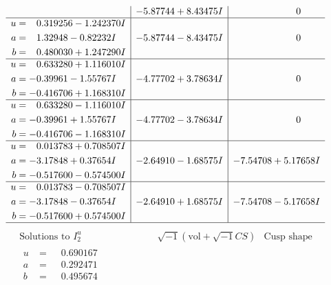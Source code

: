 \documentclass[1p]{elsarticle_modified}
\theoremstyle{definition}
\newcommand{\I}{\sqrt{-1}}
\begin{document}
$$\begin{array}{c|c|c}
 & -5.87744 + 8.43475 I & \phantom{-0.000000 } 0 \\ \hline\begin{aligned}
u &= \phantom{-}0.319256 - 1.242370 I \\
a &= \phantom{-}1.32948 - 0.82232 I \\
b &= \phantom{-}0.480030 + 1.247290 I\end{aligned}
 & -5.87744 - 8.43475 I & \phantom{-0.000000 } 0 \\ \hline\begin{aligned}
u &= \phantom{-}0.633280 + 1.116010 I \\
a &= -0.39961 - 1.55767 I \\
b &= -0.416706 + 1.168310 I\end{aligned}
 & -4.77702 + 3.78634 I & \phantom{-0.000000 } 0 \\ \hline\begin{aligned}
u &= \phantom{-}0.633280 - 1.116010 I \\
a &= -0.39961 + 1.55767 I \\
b &= -0.416706 - 1.168310 I\end{aligned}
 & -4.77702 - 3.78634 I & \phantom{-0.000000 } 0 \\ \hline\begin{aligned}
u &= \phantom{-}0.013783 + 0.708507 I \\
a &= -3.17848 + 0.37654 I \\
b &= -0.517600 - 0.574500 I\end{aligned}
 & -2.64910 - 1.68575 I & -7.54708 + 5.17658 I \\ \hline\begin{aligned}
u &= \phantom{-}0.013783 - 0.708507 I \\
a &= -3.17848 - 0.37654 I \\
b &= -0.517600 + 0.574500 I\end{aligned}
 & -2.64910 + 1.68575 I & -7.54708 - 5.17658 I\\
 \hline 
 \end{array}$$\newpage$$\begin{array}{c|c|c}  
\text{Solutions to }I^u_{2}& \I (\text{vol} + \sqrt{-1}CS) & \text{Cusp shape}\\
 \hline 
\begin{aligned}
u &= \phantom{-}0.690167\phantom{ +0.000000I} \\
a &= \phantom{-}0.292471\phantom{ +0.000000I} \\
b &= \phantom{-}0.495674\phantom{ +0.000000I}\end{aligned}

\end{array}$$
\end{document}
